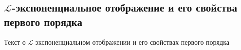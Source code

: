 \subsection{\texorpdfstring{$\mathcal{L}$-экспоненциальное отображение и его свойства первого порядка}{L-экспоненциальное отображение и его свойства первого порядка}}
Текст о $\mathcal{L}$-экспоненциальном отображении и его свойствах первого порядка
